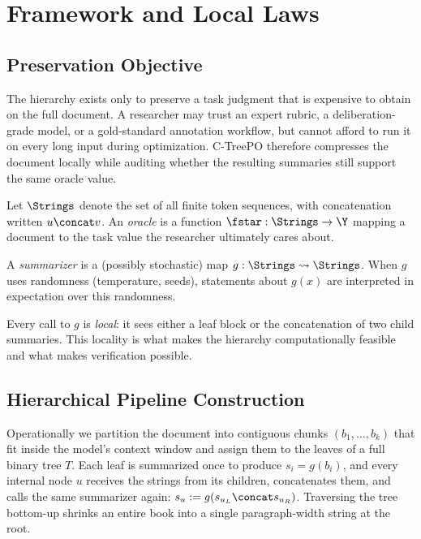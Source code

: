\section{Framework and Local Laws}\label{sec:framework}

\subsection{Preservation Objective}

The hierarchy exists only to preserve a task judgment that is expensive to obtain on the full document. A researcher may trust an expert rubric, a deliberation-grade model, or a gold-standard annotation workflow, but cannot afford to run it on every long input during optimization. C-TreePO therefore compresses the document locally while auditing whether the resulting summaries still support the same oracle value.

\begin{definition}[Oracle]\label{def:oracle}
Let $\Strings$ denote the set of all finite token sequences, with concatenation written $u \concat v$. An \emph{oracle} is a function $\fstar: \Strings \to \Y$ mapping a document to the task value the researcher ultimately cares about.
\end{definition}

\begin{definition}[Summarizer]\label{def:summarizer}
A \emph{summarizer} is a (possibly stochastic) map $g: \Strings \rightsquigarrow \Strings$. When $g$ uses randomness (temperature, seeds), statements about $g(x)$ are interpreted in expectation over this randomness.
\end{definition}

Every call to $g$ is \emph{local}: it sees either a leaf block or the concatenation of two child summaries. This locality is what makes the hierarchy computationally feasible and what makes verification possible.

\subsection{Hierarchical Pipeline Construction}

Operationally we partition the document into contiguous chunks $(b_1,\dots,b_k)$ that fit inside the model's context window and assign them to the leaves of a full binary tree $T$. Each leaf is summarized once to produce $s_i = g(b_i)$, and every internal node $u$ receives the strings from its children, concatenates them, and calls the same summarizer again: $s_u := g(s_{u_L} \concat s_{u_R})$. Traversing the tree bottom-up shrinks an entire book into a single paragraph-width string at the root.

